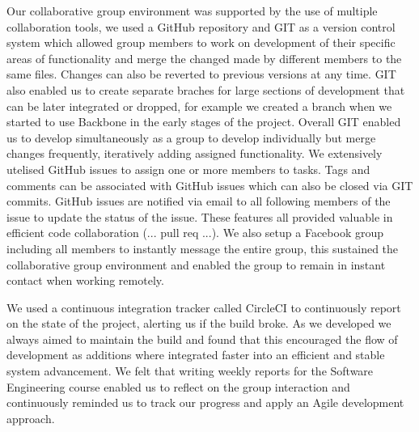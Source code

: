     Our collaborative group environment was supported by the use of multiple collaboration tools, we used a GitHub repository and GIT\cite{git} as a version control system which allowed group members to work on development of their specific areas of functionality and merge the changed made by different members to the same files. Changes can also be reverted to previous versions at any time. GIT also enabled us to create separate braches for large sections of development that can be later integrated or dropped, for example we created a branch when we started to use Backbone in the early stages of the project. Overall GIT enabled us to develop simultaneously as a group to develop individually but merge changes frequently, iteratively adding assigned functionality. We extensively utelised GitHub issues to assign one or more members to tasks. Tags and comments can be associated with GitHub issues which can also be closed via GIT commits. GitHub issues are notified via email to all following members of the issue to update the status of the issue. These features all provided valuable in efficient code collaboration (... pull req ...). We also setup a Facebook group including all members to instantly message the entire group, this sustained the collaborative group environment and enabled the group to remain in instant contact when working remotely. 

    We used a continuous integration tracker called CircleCI to continuously report on the state of the project, alerting us if the build broke. As we developed we always aimed to maintain the build and found that this encouraged the flow of development as additions where integrated faster into an efficient and stable system advancement.
    We felt that writing weekly reports for the Software Engineering course enabled us to reflect on the group interaction and continuously reminded us to track our progress and apply an Agile development approach.   